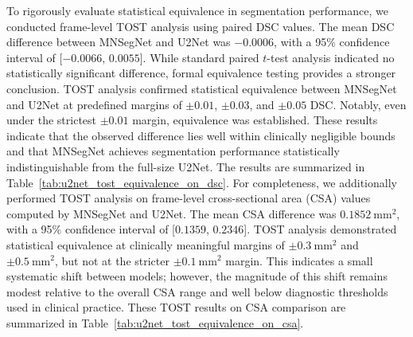 \documentclass[12pt,letterpaper]{article}
\begin{document}
\begin{enumerate}
\begin{table}[htbp]
\centering
\textcolor{red}{
\caption{TOST equivalence analysis of frame-level CSA estimates between MNSegNet and U2Net. It reports the mean difference, 95\% confidence interval, and equivalence decisions under clinically defined CSA margins (in mm$^2$).}
\label{tab:u2net_tost_equivalence_on_csa}
\renewcommand{\arraystretch}{1.15}
}
\end{table}



To rigorously evaluate statistical equivalence in segmentation performance, we conducted frame-level TOST analysis using paired DSC values. The mean DSC difference between MNSegNet and U2Net was $-0.0006$, with a 95\% confidence interval of [$-0.0066$, $0.0055$]. While standard paired $t$-test analysis indicated no statistically significant difference, formal equivalence testing provides a stronger conclusion. TOST analysis confirmed statistical equivalence between MNSegNet and U2Net at predefined margins of $\pm 0.01$, $\pm 0.03$, and $\pm 0.05$ DSC. Notably, even under the strictest $\pm 0.01$ margin, equivalence was established. These results indicate that the observed difference lies well within clinically negligible bounds and that MNSegNet achieves segmentation performance statistically indistinguishable from the full-size U2Net. The results are summarized in Table~\ref{tab:u2net_tost_equivalence_on_dsc}. For completeness, we additionally performed TOST analysis on frame-level cross-sectional area (CSA) values computed by MNSegNet and U2Net. The mean CSA difference was $0.1852~\mathrm{mm}^2$, with a 95\% confidence interval of [$0.1359$, $0.2346$]. TOST analysis demonstrated statistical equivalence at clinically meaningful margins of $\pm 0.3~\mathrm{mm}^2$ and $\pm 0.5~\mathrm{mm}^2$, but not at the stricter $\pm 0.1~\mathrm{mm}^2$ margin. This indicates a small systematic shift between models; however, the magnitude of this shift remains modest relative to the overall CSA range and well below diagnostic thresholds used in clinical practice. These TOST  results on CSA comparison are summarized in Table~\ref{tab:u2net_tost_equivalence_on_csa}.


\end{enumerate}
\end{document}
